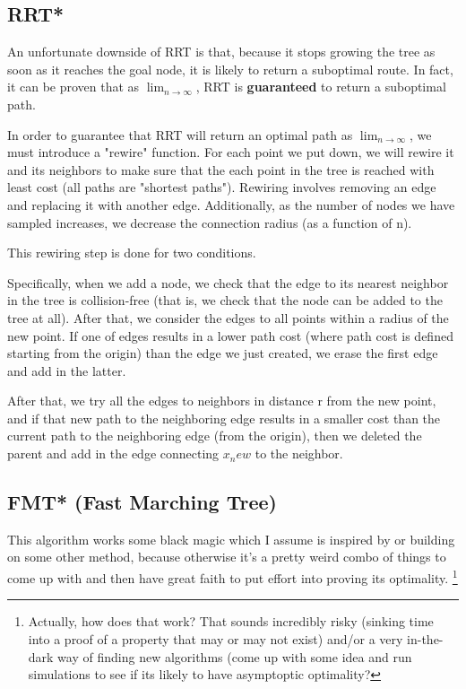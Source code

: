 \documentclass[a4paper]{article}
\begin{document}
\subsection{RRT*}

An unfortunate downside of RRT is that, because it stops growing the tree as
soon as it reaches the goal node, it is likely to return a suboptimal route. In
fact, it can be proven that as $\lim_{n\to \infty}$, RRT is \textbf{guaranteed} to return a suboptimal path. 

In order to guarantee that RRT will return an optimal path as $\lim_{n\to
\infty}$, we must introduce a "rewire" function. For each point we put down, we
will rewire it and its neighbors to make sure that the each point in the tree is
reached with least cost (all paths are "shortest paths"). Rewiring involves
removing an edge and replacing it with another edge. Additionally, as the number
of nodes we have sampled increases, we decrease the connection radius (as a
function of n).

This rewiring step is done for two conditions.

Specifically, when we add a node, we check that the edge to its nearest neighbor
in the tree is collision-free (that is, we check that the node can be added to
the tree at all). After that, we consider the edges to all points within a
radius of the new point. If one of edges results in a lower path cost (where
path cost is defined starting from the origin) than the edge we just created, we
erase the first edge and add in the latter. 

After that, we try all the edges to neighbors in distance r from the new point,
and if that new path to the neighboring edge results in a smaller cost than the
current path to the neighboring edge (from the origin), then we deleted the
parent and add in the edge connecting $x_new$ to the neighbor.


\subsection{FMT* (Fast Marching Tree)}

This algorithm works some black magic which I assume is inspired by or building
on some other method, because otherwise it's a pretty weird combo of things to come up with
and then have great faith to put effort into proving its optimality. \footnote{Actually,
how does that work? That sounds incredibly risky (sinking time into a proof of a
property that may or may not exist) and/or a very in-the-dark way
of finding new algorithms (come up with some idea and run simulations to see if
its likely to have asymptoptic optimality?}
\end{document}
